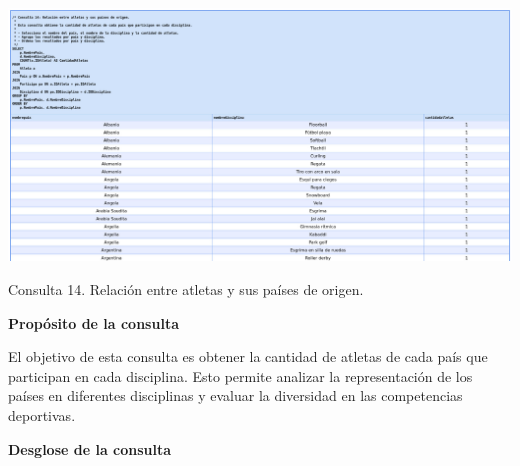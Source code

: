 \begin{center}
    \includegraphics[width=16.5cm]{resources/Consulta14.jpeg} 
    
   Consulta 14. Relación entre atletas y sus países de origen.
\end{center}

\textbf{Propósito de la consulta}

El objetivo de esta consulta es obtener la cantidad de atletas de cada país que participan en cada disciplina. Esto permite analizar la representación de los países en diferentes disciplinas y evaluar la diversidad en las competencias deportivas.

\textbf{Desglose de la consulta}

